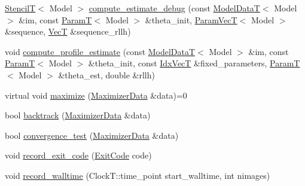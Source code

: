 \begin{DoxyCompactItemize}
\hyperlink{namespacemappel_a3a06598240007876f8c4bf834ad86197}{StencilT}$<$ Model $>$ \hyperlink{classmappel_1_1IterativeMaximizer_aa45c11a399f29985fc9bd3365e809335}{compute\+\_\+estimate\+\_\+debug} (const \hyperlink{namespacemappel_a97f050df953605381ae9c901c3b125f1}{Model\+DataT}$<$ Model $>$ \&im, const \hyperlink{namespacemappel_a667925cb0d6c0e49f2f035cc5a9a6857}{ParamT}$<$ Model $>$ \&theta\+\_\+init, \hyperlink{namespacemappel_a0f86d3153e4e27b095012f140eea58de}{Param\+VecT}$<$ Model $>$ \&sequence, \hyperlink{namespacemappel_a2225ad69f358daa3f4f99282a35b9a3a}{VecT} \&sequence\+\_\+rllh)
\item 
void \hyperlink{classmappel_1_1IterativeMaximizer_a1999fd1fa63c803b3aad87695fc82843}{compute\+\_\+profile\+\_\+estimate} (const \hyperlink{namespacemappel_a97f050df953605381ae9c901c3b125f1}{Model\+DataT}$<$ Model $>$ \&im, const \hyperlink{namespacemappel_a667925cb0d6c0e49f2f035cc5a9a6857}{ParamT}$<$ Model $>$ \&theta\+\_\+init, const \hyperlink{namespacemappel_ac63743dcd42180127307cd0e4ecdd784}{Idx\+VecT} \&fixed\+\_\+parameters, \hyperlink{namespacemappel_a667925cb0d6c0e49f2f035cc5a9a6857}{ParamT}$<$ Model $>$ \&theta\+\_\+est, double \&rllh)
\item 
virtual void \hyperlink{classmappel_1_1IterativeMaximizer_a4d05ed89de53e6e73f2f13bef30862ec}{maximize} (\hyperlink{classmappel_1_1QuasiNewtonMaximizer_a558d3c5e494648dcb756de6a2779402e}{Maximizer\+Data} \&data)=0
\item 
bool \hyperlink{classmappel_1_1IterativeMaximizer_ac033d2b23a6a861e6d7adbe35f17624e}{backtrack} (\hyperlink{classmappel_1_1QuasiNewtonMaximizer_a558d3c5e494648dcb756de6a2779402e}{Maximizer\+Data} \&data)
\item 
bool \hyperlink{classmappel_1_1IterativeMaximizer_aef9b61d66d785a1a06dd2c75c3166435}{convergence\+\_\+test} (\hyperlink{classmappel_1_1QuasiNewtonMaximizer_a558d3c5e494648dcb756de6a2779402e}{Maximizer\+Data} \&data)
\item 
void \hyperlink{classmappel_1_1ThreadedEstimator_a8fefc448211f9caa3612ba4f34b006ab}{record\+\_\+exit\+\_\+code} (\hyperlink{classmappel_1_1Estimator_a6d599915907ba4d0607fcb958d231edc}{Exit\+Code} code)
\item 
void \hyperlink{classmappel_1_1Estimator_a50125572d3b87ebcf1ffb27a8d8c643d}{record\+\_\+walltime} (Clock\+T\+::time\+\_\+point start\+\_\+walltime, int nimages)
\end{DoxyCompactItemize}
